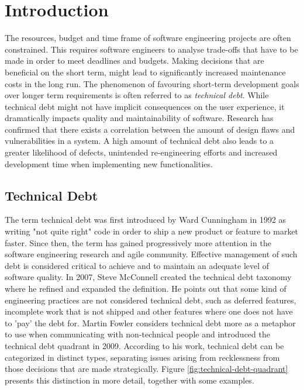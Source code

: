 \chapter{Introduction}


The resources, budget and time frame of software engineering projects are often constrained\cite{guo2011tracking}.
This requires software engineers to analyse trade-offs that have to be made in order to meet deadlines and budgets.
Making decisions that are beneficial on the short term, might lead to significantly increased maintenance costs in the long run.
The phenomenon of favouring short-term development goals over longer term requirements is often referred to as \emph{technical debt}.
While technical debt might not have implicit consequences on the user experience, it dramatically impacts quality and maintainability of software.
Research has confirmed that there exists a correlation between the amount of design flaws and vulnerabilities in a system\cite{nord2016debtvulnerabilities}.
A high amount of technical debt also leads to a greater likelihood of defects, unintended re-engineering efforts\cite{li2014empirical} and increased development time when implementing new functionalities.

\section{Technical Debt}
The term technical debt was first introduced by Ward Cunningham in 1992 as writing "not quite right" code in order to ship a new product or feature to market faster\cite{cunningham1993wycash}.
Since then, the term has gained progressively more attention in the software engineering research and agile community.
Effective management of such debt is considered critical to achieve and to maintain an adequate level of software quality.
In 2007, Steve McConnell created the technical debt taxonomy where he refined and expanded the definition\cite{mcconnell2007debt}.
He points out that some kind of engineering practices are not considered technical debt, such as deferred features, incomplete work that is not shipped and other features where one does not have to 'pay' the debt for.
Martin Fowler considers technical debt more as a metaphor to use when communicating with non-technical people and introduced the technical debt quadrant in 2009\cite{technicaldebtquadrant}.
According to his work, technical debt can be categorized in distinct types, separating issues arising from recklessness from those decisions that are made strategically. 
Figure \ref{fig:technical-debt-quadrant} presents this distinction in more detail, together with some examples.\\

